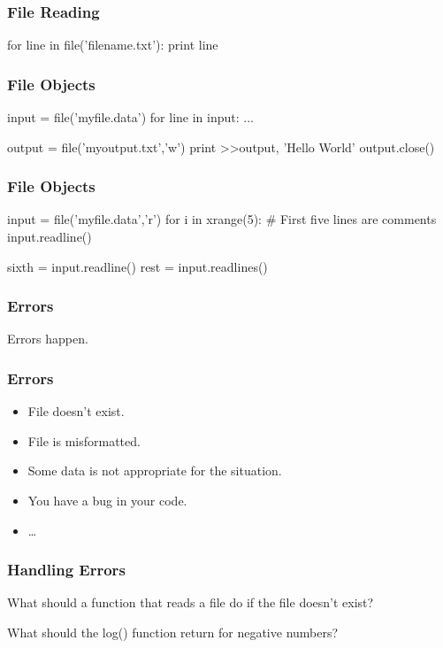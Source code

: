 \begin{frame}[fragile]
\frametitle{File Reading}

\begin{python}
for line in file('filename.txt'):
    print line
\end{python}

\end{frame}

\begin{frame}[fragile]
\frametitle{File Objects}

\begin{python}
input = file('myfile.data')
for line in input:
    ...
\end{python}

\begin{python}
output = file('myoutput.txt','w')
print >>output, 'Hello World\n'
output.close()
\end{python}
\end{frame}

\begin{frame}[fragile]
\frametitle{File Objects}
\begin{python}
input = file('myfile.data','r')
for i in xrange(5):
    # First five lines are comments
    input.readline()

sixth = input.readline()
rest = input.readlines()
\end{python}
\end{frame}


\begin{frame}[fragile]
\frametitle{Errors}
Errors happen.
\end{frame}

\begin{frame}[fragile]
\frametitle{Errors}

\begin{itemize}
\item File doesn't exist.
\item File is misformatted.
\item Some data is not appropriate for the situation.
\item You have a bug in your code.
\item \ldots
\end{itemize}

\end{frame}

\begin{frame}[fragile]
\frametitle{Handling Errors}

What should a function that reads a file do if the file doesn't exist?

What should the log() function return for negative numbers?
\end{frame}

